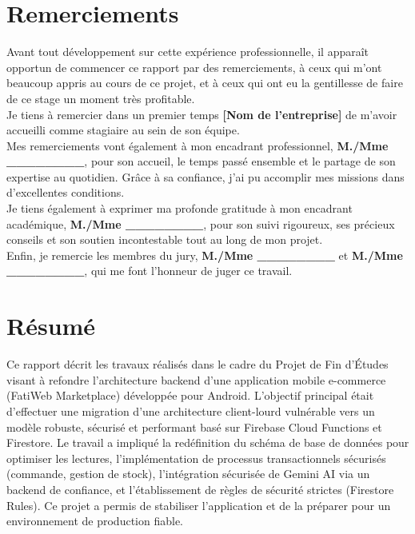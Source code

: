 \documentclass[12pt,a4paper]{report}
\begin{document}
\chapter*{Remerciements}
\thispagestyle{empty}

Avant tout développement sur cette expérience professionnelle, il apparaît opportun de commencer ce rapport par des remerciements, à ceux qui m'ont beaucoup appris au cours de ce projet, et à ceux qui ont eu la gentillesse de faire de ce stage un moment très profitable.\\

Je tiens à remercier dans un premier temps \textbf{[Nom de l'entreprise]} de m'avoir accueilli comme stagiaire au sein de son équipe.\\

Mes remerciements vont également à mon encadrant professionnel, \textbf{M./Mme \_\_\_\_\_\_\_\_}, pour son accueil, le temps passé ensemble et le partage de son expertise au quotidien. Grâce à sa confiance, j'ai pu accomplir mes missions dans d'excellentes conditions.\\

Je tiens également à exprimer ma profonde gratitude à mon encadrant académique, \textbf{M./Mme \_\_\_\_\_\_\_\_}, pour son suivi rigoureux, ses précieux conseils et son soutien incontestable tout au long de mon projet.\\

Enfin, je remercie les membres du jury, \textbf{M./Mme \_\_\_\_\_\_\_\_} et \textbf{M./Mme \_\_\_\_\_\_\_\_}, qui me font l'honneur de juger ce travail.

\clearpage

\chapter*{Résumé}
Ce rapport décrit les travaux réalisés dans le cadre du Projet de Fin d'Études visant à refondre l'architecture backend d'une application mobile e-commerce (FatiWeb Marketplace) développée pour Android. L'objectif principal était d'effectuer une migration d'une architecture client-lourd vulnérable vers un modèle robuste, sécurisé et performant basé sur Firebase Cloud Functions et Firestore. Le travail a impliqué la redéfinition du schéma de base de données pour optimiser les lectures, l'implémentation de processus transactionnels sécurisés (commande, gestion de stock), l'intégration sécurisée de Gemini AI via un backend de confiance, et l'établissement de règles de sécurité strictes (Firestore Rules). Ce projet a permis de stabiliser l'application et de la préparer pour un environnement de production fiable.
\end{document}
